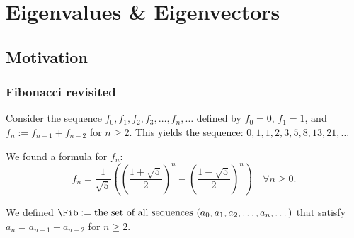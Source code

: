 \setcounter{chapter}{20} %
\chapter{Eigenvalues \& Eigenvectors}

%
\renewcommand{\thetheorem}{21.a.\arabic{theorem}}
\setcounter{theorem}{0}

\section{Motivation}

\subsection{Fibonacci revisited}
Consider the sequence $f_0, f_1, f_2, f_3, \dots, f_n, \dots$ defined by $f_0 = 0$, $f_1 = 1$, and $f_n := f_{n-1} + f_{n-2}$ for $n \ge 2$.
This yields the sequence: $0, 1, 1, 2, 3, 5, 8, 13, 21, \dots$

We found a formula for $f_n$:
\[ f_n = \frac{1}{\sqrt{5}} \left( \left(\frac{1+\sqrt{5}}{2}\right)^n - \left(\frac{1-\sqrt{5}}{2}\right)^n \right) \quad \forall n \ge 0. \]

We defined $\Fib := \text{the set of all sequences } (a_0, a_1, a_2, \dots, a_n, \dots)$ that satisfy $a_n = a_{n-1} + a_{n-2}$ for $n \ge 2$.

